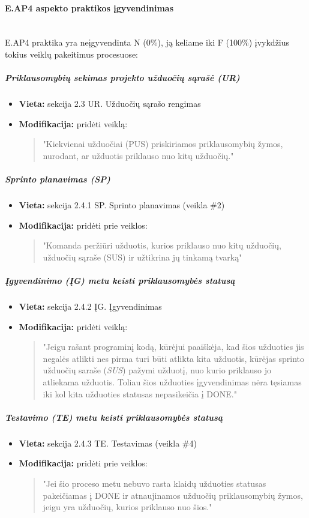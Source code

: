 \documentclass{article}
\newcommand{\subsubsubsection}[1]{\paragraph{#1}\mbox{}\\}
\begin{document}
\pagebreak
\subsubsubsection{E.AP4 aspekto praktikos įgyvendinimas}

E.AP4 praktika yra neįgyvendinta N (0\%), ją keliame iki F (100\%) įvykdžius tokius veiklų pakeitimus procesuose:

\subparagraph{Priklausomybių sekimas projekto užduočių sąrašė (UR)}
\begin{itemize}
    \item \textbf{Vieta:} sekcija 2.3 UR. Užduočių sąrašo rengimas
    \item \textbf{Modifikacija:} pridėti veiklą:
    \begin{quote}
        "Kiekvienai užduočiai (PUS) priskiriamos priklausomybių žymos, nurodant, ar užduotis priklauso nuo kitų užduočių."
    \end{quote}
\end{itemize}

\subparagraph{Sprinto planavimas (SP)}
\begin{itemize}
    \item \textbf{Vieta:} sekcija 2.4.1 SP. Sprinto planavimas (veikla \#2)
    \item \textbf{Modifikacija:} pridėti prie veiklos:
    \begin{quote}
        "Komanda peržiūri užduotis, kurios priklauso nuo kitų užduočių, užduočių sąraše (SUS) ir užtikrina jų tinkamą tvarką"
    \end{quote}
\end{itemize}

\subparagraph{Įgyvendinimo (ĮG) metu keisti priklausomybės statusą}
\begin{itemize}
    \item \textbf{Vieta:} sekcija 2.4.2 ĮG. Įgyvendinimas
    \item \textbf{Modifikacija:} pridėti veiklą:
    \begin{quote}
        "Jeigu rašant programinį kodą, kūrėjui paaiškėja, kad šios užduoties jis negalės atlikti nes pirma turi būti atlikta kita užduotis, kūrėjas sprinto užduočių saraše (\textit{SUS}) pažymi užduotį, nuo kurio priklauso jo atliekama užduotis. Toliau šios užduoties įgyvendinimas nėra tęsiamas iki kol kita užduoties statusas nepasikeičia į DONE."
    \end{quote}
\end{itemize}

\subparagraph{Testavimo (TE) metu keisti priklausomybės statusą}
\begin{itemize}
    \item \textbf{Vieta:} sekcija 2.4.3 TE. Testavimas (veikla \#4)
    \item \textbf{Modifikacija:} pridėti prie veiklos:
    \begin{quote}
        "Jei šio proceso metu nebuvo rasta klaidų užduoties statusas pakeičiamas į DONE ir atnaujinamos užduočių priklausomybių žymos, jeigu yra užduočių, kurios priklauso nuo šios."
    \end{quote}
\end{itemize}
\end{document}
